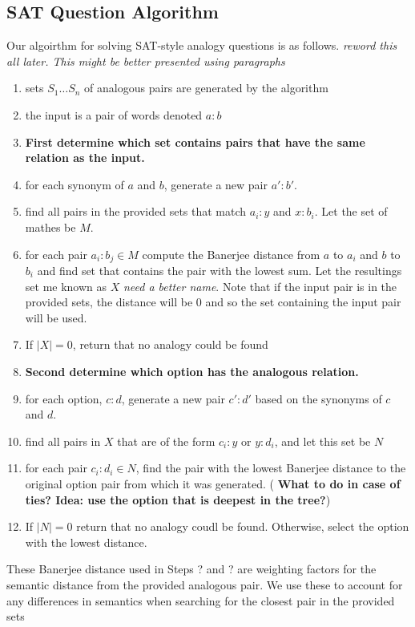 \documentclass[11pt]{article}
\begin{document}
\subsection{SAT Question Algorithm}

Our algoirthm for solving SAT-style analogy questions is as
follows. \emph{reword this all later.  This might be better presented using
  paragraphs}

\begin{enumerate}
  \item sets $S_1 \ldots S_n$ of analogous pairs are generated by the algorithm
  \item the input is a pair of words denoted $a:b$
  \item[] {\bf First determine which set contains pairs that have the same
    relation as the input.}
  \item for each synonym of $a$ and $b$, generate a new pair $a':b'$.
  \item find all pairs in the provided sets that match $a_i:y$ and $x:b_i$.  Let
    the set of mathes be $M$.
  \item for each pair $a_i:b_j \in M$ compute the Banerjee distance from $a$ to
    $a_i$ and $b$ to $b_i$ and find set that contains the pair with the lowest
    sum.  Let the resultings set me known as $X$ \emph{need a better name}.
    Note that if the input pair is in the provided sets, the distance will be 0
    and so the set containing the input pair will be used.
  \item If $|X| = 0$, return that no analogy could be found
  \item[] {\bf Second determine which option has the analogous relation.}
  \item for each option, $c:d$, generate a new pair $c':d'$ based on the
    synonyms of $c$ and $d$.
  \item find all pairs in $X$ that are of the form $c_i:y$ or $y:d_i$, and let
    this set be $N$
  \item for each pair $c_i:d_i \in N$, find the pair with the lowest Banerjee
    distance to the original option pair from which it was generated.  ({\bf
      What to do in case of ties?  Idea: use the option that is deepest in the
      tree?})    
  \item If $|N| = 0$ return that no analogy coudl be found.  Otherwise, select
    the option with the lowest distance.
\end{enumerate}
These Banerjee distance used in Steps ? and ? are weighting factors for the
semantic distance from the provided analogous pair.  We use these to account for
any differences in semantics when searching for the closest pair in the provided
sets
\end{document}
